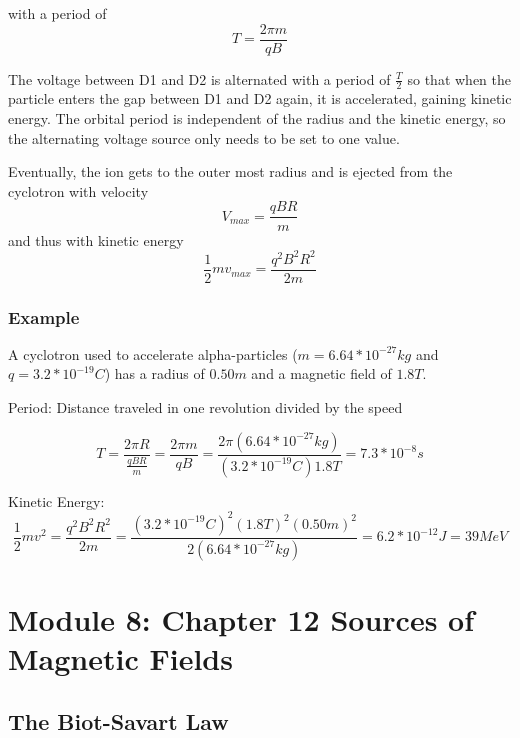 \documentclass[14pt]{memoir}
\begin{document}
with a period of
\begin{equation}
T = \frac{2 \pi m}{qB}
\end{equation}

The voltage between D1 and D2 is alternated with a period of $\frac{T}{2}$ so that when the particle enters the gap between D1 and D2 again, it is accelerated, gaining kinetic energy. The orbital period is independent of the radius and the kinetic energy, so the alternating voltage source only needs to be set to one value. 

Eventually, the ion gets to the outer most radius and is ejected from the cyclotron with velocity
\begin{equation}
V_{max} = \frac{qBR}{m}
\end{equation}
and thus with kinetic energy
\begin{equation}
\frac{1}{2} m v_{max} = \frac{q^2 B^2 R^2}{2m} 
\end{equation}

\subsection{Example}

A cyclotron used to accelerate alpha-particles ($m = 6.64*10^{-27}kg$ and $q = 3.2*10^{-19}C$) has a radius of $0.50m$ and a magnetic field of $1.8T$. 

Period: Distance traveled in one revolution divided by the speed

\begin{equation}
T = \frac{2 \pi R}{\frac{q B R}{m}}=\frac{2 \pi m}{q B} = \frac{2 \pi (6.64*10^{-27}kg)}{(3.2*10^{-19}C){1.8T}} = 7.3*10^{-8} s
\end{equation}

Kinetic Energy:
\begin{equation}
\frac{1}{2} m v^2 = \frac{q^2 B^2 R^2}{2m} = \frac{(3.2*10^{-19}C)^2(1.8T)^2(0.50m)^2}{2(6.64*10^{-27}kg)} = 6.2 * 10^{-12} J = 39 MeV
\end{equation}

\chapter{Module 8: Chapter 12 Sources of Magnetic Fields}

\section{The Biot-Savart Law}
\end{document}
